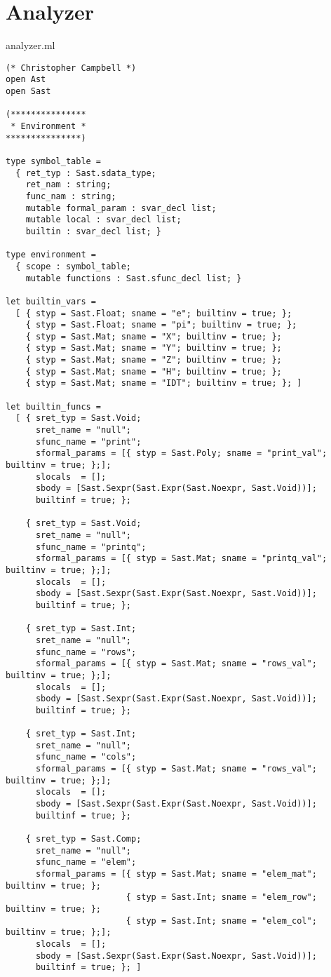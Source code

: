 \section{Analyzer}
analyzer.ml
\begin{lstlisting}
(* Christopher Campbell *)
open Ast
open Sast

(***************
 * Environment *
***************)

type symbol_table =
  { ret_typ : Sast.sdata_type;
    ret_nam : string;
    func_nam : string;
    mutable formal_param : svar_decl list;
    mutable local : svar_decl list; 
    builtin : svar_decl list; }

type environment =
  { scope : symbol_table;
    mutable functions : Sast.sfunc_decl list; }

let builtin_vars =
  [ { styp = Sast.Float; sname = "e"; builtinv = true; };
    { styp = Sast.Float; sname = "pi"; builtinv = true; };
    { styp = Sast.Mat; sname = "X"; builtinv = true; };
    { styp = Sast.Mat; sname = "Y"; builtinv = true; };
    { styp = Sast.Mat; sname = "Z"; builtinv = true; };   
    { styp = Sast.Mat; sname = "H"; builtinv = true; };
    { styp = Sast.Mat; sname = "IDT"; builtinv = true; }; ]

let builtin_funcs = 
  [ { sret_typ = Sast.Void;
      sret_name = "null";
      sfunc_name = "print";
      sformal_params = [{ styp = Sast.Poly; sname = "print_val"; builtinv = true; };];
      slocals  = [];
      sbody = [Sast.Sexpr(Sast.Expr(Sast.Noexpr, Sast.Void))];
      builtinf = true; };

    { sret_typ = Sast.Void;
      sret_name = "null";
      sfunc_name = "printq";
      sformal_params = [{ styp = Sast.Mat; sname = "printq_val"; builtinv = true; };];
      slocals  = [];
      sbody = [Sast.Sexpr(Sast.Expr(Sast.Noexpr, Sast.Void))];
      builtinf = true; }; 

    { sret_typ = Sast.Int;
      sret_name = "null";
      sfunc_name = "rows";
      sformal_params = [{ styp = Sast.Mat; sname = "rows_val"; builtinv = true; };];
      slocals  = [];
      sbody = [Sast.Sexpr(Sast.Expr(Sast.Noexpr, Sast.Void))];
      builtinf = true; };

    { sret_typ = Sast.Int;
      sret_name = "null";
      sfunc_name = "cols";
      sformal_params = [{ styp = Sast.Mat; sname = "rows_val"; builtinv = true; };];
      slocals  = [];
      sbody = [Sast.Sexpr(Sast.Expr(Sast.Noexpr, Sast.Void))];
      builtinf = true; };

    { sret_typ = Sast.Comp;
      sret_name = "null";
      sfunc_name = "elem";
      sformal_params = [{ styp = Sast.Mat; sname = "elem_mat"; builtinv = true; };
                        { styp = Sast.Int; sname = "elem_row"; builtinv = true; };
                        { styp = Sast.Int; sname = "elem_col"; builtinv = true; };];
      slocals  = [];
      sbody = [Sast.Sexpr(Sast.Expr(Sast.Noexpr, Sast.Void))];
      builtinf = true; }; ]


\end{lstlisting}
